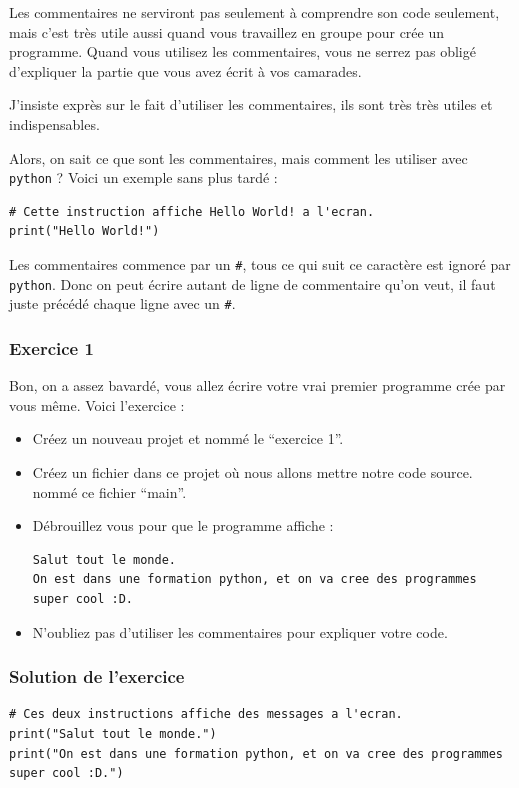 \documentclass[12pt]{article}
\newcommand{\code}[1]{\colorbox{light-gray}{\texttt{#1}}}
\begin{document}
            Les commentaires ne serviront pas seulement à comprendre son code seulement, mais c'est très utile aussi
            quand vous travaillez en groupe pour crée un programme. Quand vous utilisez les commentaires, vous ne serrez
            pas obligé d'expliquer la partie que vous avez écrit à vos camarades.
            
            J'insiste exprès sur le fait d'utiliser les commentaires, ils sont très très utiles et indispensables.

            Alors, on sait ce que sont les commentaires, mais comment les utiliser avec \code{python} ? Voici 
            un exemple sans plus tardé :
            \begin{lstlisting}[style=code]
# Cette instruction affiche Hello World! a l'ecran.
print("Hello World!") 
            \end{lstlisting}

            Les commentaires commence par un \code{\#}, tous ce qui suit ce caractère est ignoré par \code{python}.
            Donc on peut écrire autant de ligne de commentaire qu'on veut, il faut juste précédé chaque ligne avec un
            \code{\#}.

        \subsubsection{Exercice 1}
            Bon, on a assez bavardé, vous allez écrire votre vrai premier programme crée par vous même.
            Voici l'exercice :
            \begin{itemize}
                \item Créez un nouveau projet et nommé le ``exercice 1''.
                \item Créez un fichier dans ce projet où nous allons mettre notre code source. nommé ce fichier
                    ``main''.
                \item Débrouillez vous pour que le programme affiche :
                    \begin{lstlisting}[style=exec_result, breaklines=false]
Salut tout le monde.
On est dans une formation python, et on va cree des programmes super cool :D.
                    \end{lstlisting}
                \item N'oubliez pas d'utiliser les commentaires pour expliquer votre code.
            \end{itemize}

        \subsubsection{Solution de l'exercice}
            \begin{lstlisting}[style=code, breaklines=false]
# Ces deux instructions affiche des messages a l'ecran.
print("Salut tout le monde.")
print("On est dans une formation python, et on va cree des programmes super cool :D.")
            \end{lstlisting}
\end{document}

